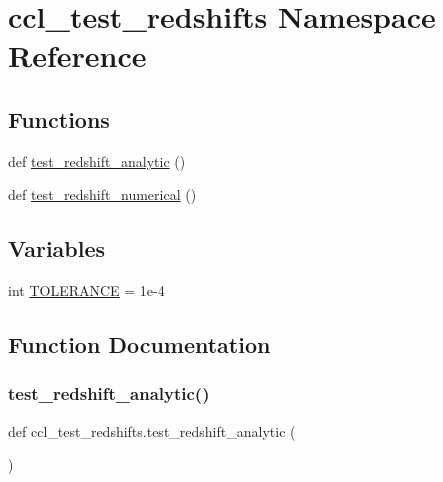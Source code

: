 \hypertarget{namespaceccl__test__redshifts}{}\section{ccl\+\_\+test\+\_\+redshifts Namespace Reference}
\label{namespaceccl__test__redshifts}
\subsection*{Functions}
\begin{DoxyCompactItemize}
\item 
def \mbox{\hyperlink{namespaceccl__test__redshifts_ae0b9e0335521d3e43cac209fdfbedcae}{test\+\_\+redshift\+\_\+analytic}} ()
\item 
def \mbox{\hyperlink{namespaceccl__test__redshifts_af81d0c614f91e76b14c500fd5b1e9e33}{test\+\_\+redshift\+\_\+numerical}} ()
\end{DoxyCompactItemize}
\subsection*{Variables}
\begin{DoxyCompactItemize}
\item 
int \mbox{\hyperlink{namespaceccl__test__redshifts_ad867df656798ce3f541052449522b8f2}{T\+O\+L\+E\+R\+A\+N\+CE}} = 1e-\/4
\end{DoxyCompactItemize}


\subsection{Function Documentation}
\mbox{\label{namespaceccl__test__redshifts_ae0b9e0335521d3e43cac209fdfbedcae}} 
\subsubsection{\texorpdfstring{test\+\_\+redshift\+\_\+analytic()}{test\_redshift\_analytic()}}
{\footnotesize\ttfamily def ccl\+\_\+test\+\_\+redshifts.\+test\+\_\+redshift\+\_\+analytic (\begin{DoxyParamCaption}{ }\end{DoxyParamCaption})}

